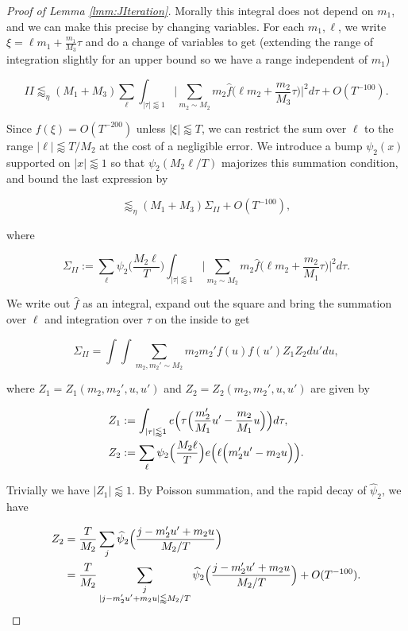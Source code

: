 \documentclass{amsart}
\theoremstyle{plain}
\numberwithin{equation}{section}
\begin{document}
\begin{proof}[Proof of  Lemma \ref{lmm:JIteration}]
Morally this integral does not depend on $m_1$, and we can make this precise by changing variables. For each $m_1, \ell$, we write $\xi = \ell m_1 + \frac{m_1}{M_3} \tau $ and do a change of variables to get (extending the range of integration slightly for an upper bound so we have a range independent of $m_1$)


\[ II \lessapprox_\eta (M_1 +  M_3) \sum_{\ell }  \int_{|\tau| \lessapprox 1}  \Big|   \sum_{m_2 \sim M_2} m_2 \widehat{f} \Big( \ell m_2 + \frac{m_2}{M_3} \tau \Big) \Big|^2 d \tau+O(T^{-100}). \]

Since $\widehat{f}(\xi)=O(T^{-200})$ unless $|\xi | \lessapprox T$, we can restrict the sum over $\ell$ to the range $| \ell | \lessapprox T/ M_2$ at the cost of a negligible error.  We introduce a bump  $\psi_2(x)$ supported on $|x| \lessapprox 1$ so that $\psi_2(M_2\ell/T)$ majorizes this summation condition, and bound the last expression by

\[ \lessapprox_\eta (M_1 + M_3)\Sigma_{II}+O(T^{-100}), \]

where

\[ \Sigma_{II}:= \sum_{\ell}  \psi_2 \Big(\frac{M_2 \ell}{T} \Big) \int_{| \tau| \lessapprox 1}   \Big|   \sum_{m_2 \sim M_2}  m_2 \widehat{f} \Big( \ell m_2 + \frac{m_2}{M_1}  \tau \Big) \Big|^2 d  \tau.\]

We write out $\widehat{f}$ as an integral, expand out the square and bring the summation over $\ell$ and integration over $\tau$ on the inside to get

\begin{equation}
 \Sigma_{II}=  \int \int \sum_{m_2, m_2' \sim M_2}m_2 m_2' f(u) f(u') Z_1 Z_2 du' du, \label{eq:SigmaII}
 \end{equation}

where $Z_1=Z_1(m_2,m_2',u,u')$ and $Z_2=Z_2(m_2,m_2',u,u')$ are given by

\begin{align*}
Z_1&:=  \int_{| \tau| \lessapprox 1} e\Bigl(\tau\Bigl( \frac{m_2'}{M_1}u' - \frac{m_2}{M_1} u\Bigr)\Bigr)d\tau ,\\
 Z_2&:= \sum_{\ell}  \psi_2 \Big(\frac{M_2 \ell}{T} \Big) e\Bigl(\ell\Bigl(m_2' u' - m_2 u\Bigr)\Bigr).
\end{align*}

Trivially we have $|Z_1|\lessapprox 1$. By Poisson summation, and the rapid decay of $\widehat{\psi}_2$, we have

\begin{align*}
Z_2&=\frac{T}{M_2}\sum_{j}  \widehat{\psi}_2\Bigl(\frac{j-m_2'u'+m_2u}{M_2/T}\Bigr)\\
&=\frac{T}{M_2}\sum_{\substack{j\\ |j-m_2'u'+m_2u|\lessapprox M_2/T}}  \widehat{\psi}_2\Bigl(\frac{j-m_2'u'+m_2u}{M_2/T}\Bigr)+O(T^{-100}).
\end{align*}


\end{proof}
\end{document}
